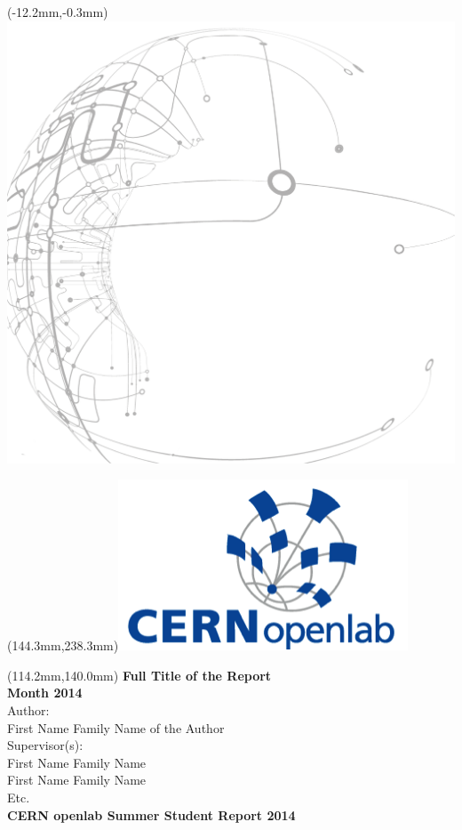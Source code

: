 \documentclass[12pt, letterpaper]{article}            %
\begin{document}
\begin{textblock*}{0mm}(-12.2mm,-0.3mm)\noindent \includegraphics*{./gfx/bg.png}\end{textblock*}
\begin{textblock*}{0mm}(144.3mm,238.3mm)\noindent \includegraphics*{./gfx/openlab.png}\end{textblock*}
\begin{textblock*}{150mm}(114.2mm,140.0mm)\noindent
\textbf{\fontsize{20}{20}\selectfont\color{natc}Full Title of the Report}\\[36pt]
\textbf{\fontsize{16}{20}\selectfont\color{natc}Month 2014}\\[18pt]
{\fontsize{14}{20}\selectfont\color{subc}Author:}\\
{\fontsize{14}{20}\selectfont\color{subc}First Name Family Name of the Author}\\[18pt]
{\fontsize{14}{20}\selectfont\color{subc}Supervisor(s):}\\
{\fontsize{14}{20}\selectfont\color{subc}First Name Family Name}\\
{\fontsize{14}{20}\selectfont\color{subc}First Name Family Name}\\
{\fontsize{14}{20}\selectfont\color{subc}Etc.}\\[18pt]
\textbf{\fontsize{11}{20}\selectfont\color{subc}CERN openlab Summer Student Report 2014}

\end{textblock*}
~
\thispagestyle{empty}
\newpage
\end{document}
